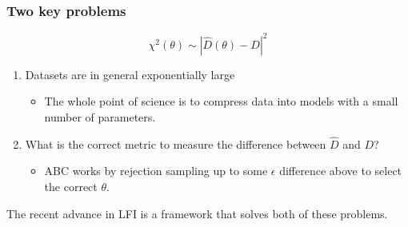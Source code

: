 \documentclass[%
    9pt,
]{beamer}
\begin{document}
\begin{frame}
  \frametitle{Two key problems}
  \[\chi^2(\theta) \sim |\hat{D}(\theta) - D |^2\]
  \begin{enumerate}
      \item Datasets are in general exponentially large
          \begin{itemize}
              \item The whole point of science is to compress data into models with a small number of parameters.
          \end{itemize}
      \item What is the correct metric to measure the difference between $\hat{D}$ and $D$?
          \begin{itemize}
              \item ABC works by rejection sampling up to some $\epsilon$ difference above to select the correct $\theta$.
          \end{itemize}
  \end{enumerate}
  The recent advance in LFI is a framework that solves both of these problems.
\end{frame}
\end{document}
